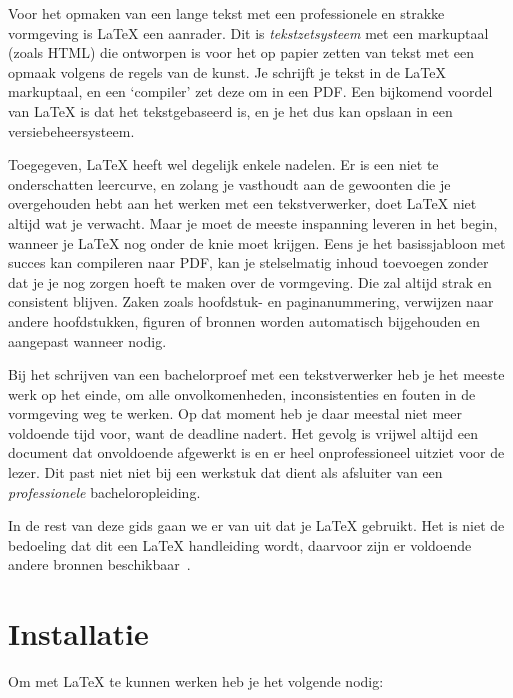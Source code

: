 Voor het opmaken van een lange tekst met een professionele en strakke vormgeving is {\LaTeX} een aanrader. Dit is \emph{tekstzetsysteem} met een markuptaal (zoals HTML) die ontworpen is voor het op papier zetten van tekst met een opmaak volgens de regels van de kunst. Je schrijft je tekst in de {\LaTeX} markuptaal, en een `compiler' zet deze om in een PDF. Een bijkomend voordel van {\LaTeX} is dat het tekstgebaseerd is, en je het dus kan opslaan in een versiebeheersysteem.

Toegegeven, {\LaTeX} heeft wel degelijk enkele nadelen. Er is een niet te onderschatten leercurve, en zolang je vasthoudt aan de gewoonten die je overgehouden hebt aan het werken met een tekstverwerker, doet {\LaTeX} niet altijd wat je verwacht. Maar je moet de meeste inspanning leveren in het begin, wanneer je {\LaTeX} nog onder de knie moet krijgen. Eens je het basissjabloon met succes kan compileren naar PDF, kan je stelselmatig inhoud toevoegen zonder dat je je nog zorgen hoeft te maken over de vormgeving. Die zal altijd strak en consistent blijven. Zaken zoals hoofdstuk- en paginanummering, verwijzen naar andere hoofdstukken, figuren of bronnen worden automatisch bijgehouden en aangepast wanneer nodig.

Bij het schrijven van een bachelorproef met een tekstverwerker heb je het mees\-te werk op het einde, om alle onvolkomenheden, inconsistenties en fouten in de vormgeving weg te werken. Op dat moment heb je daar meestal niet meer voldoende tijd voor, want de deadline nadert. Het gevolg is vrijwel altijd een document dat onvoldoende afgewerkt is en er heel onprofessioneel uitziet voor de lezer. Dit past niet niet bij een werkstuk dat dient als afsluiter van een \textit{professionele} bacheloropleiding.

In de rest van deze gids gaan we er van uit dat je {\LaTeX} gebruikt. Het is niet de bedoeling dat dit een {\LaTeX} handleiding wordt, daarvoor zijn er voldoende andere bronnen beschikbaar~\parencite{Oetiker2015}.

\section{Installatie}%
\label{sec:latex-installatie}

Om met {\LaTeX} te kunnen werken heb je het volgende nodig:

